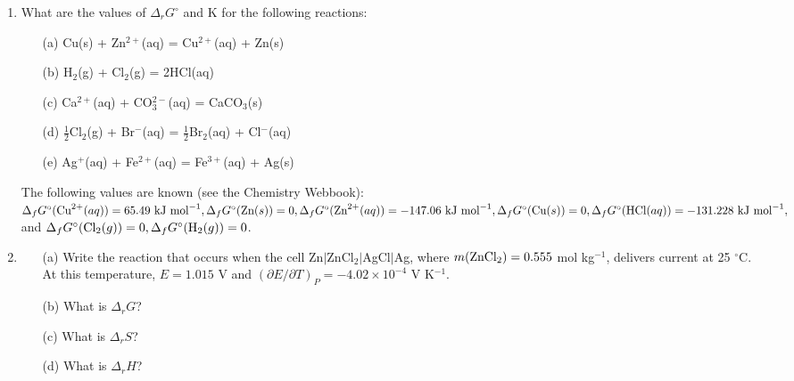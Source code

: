 \begin{enumerate}

\item What are the values of $\Delta_rG^\circ$ and K for the following reactions:
\begin{itemize}
\item[(a)] Cu(s) + Zn$^{2+}$(aq) = Cu$^{2+}$(aq) + Zn(s)
\item[(b)] H$_2$(g) + Cl$_2$(g) = 2HCl(aq)
\item[(c)] Ca$^{2+}$(aq) + CO$_3^{2-}$(aq) = CaCO$_3$(s)
\item[(d)] $\frac{1}{2}$Cl$_2$(g) + Br$^-$(aq) = $\frac{1}{2}$Br$_2$(aq) + Cl$^-$(aq)
\item[(e)] Ag$^+$(aq) + Fe$^{2+}$(aq) = Fe$^{3+}$(aq) + Ag(s)
\end{itemize}
The following values are known (see the Chemistry Webbook):\\ $\Delta_fG^\circ(\textnormal{Cu}^{2+}(aq)) = 65.49\textnormal{ kJ mol}^{-1}, \Delta_fG^\circ(\textnormal{Zn}(s)) = 0, \Delta_fG^\circ(\textnormal{Zn}^{2+}(aq)) = -147.06\textnormal{ kJ mol}^{-1}, \Delta_fG^\circ(\textnormal{Cu}(s)) = 0, \Delta_fG^\circ(\textnormal{HCl}(aq)) = -131.228\textnormal{ kJ mol}^{-1},$ and $\Delta_fG^\circ(\textnormal{Cl}_2(g)) = 0, \Delta_fG^\circ(\textnormal{H}_2(g)) = 0$.\\


\item
\begin{itemize}
\item[(a)] Write the reaction that occurs when the cell Zn$\vert$ZnCl$_2\vert$AgCl$\vert$Ag, where $m(\textnormal{ZnCl}_2) = 0.555$ mol kg$^{-1}$, delivers current at 25 $^\circ$C. At this temperature, $E = 1.015$ V and $\left(\partial E/\partial T\right)_P = -4.02\times 10^{-4}$ V K$^{-1}$. 
\item[(b)] What is $\Delta_rG$?
\item[(c)] What is $\Delta_rS$?
\item[(d)] What is $\Delta_rH$?
\end{itemize}

\vspace*{0.2cm}



\end{enumerate}
